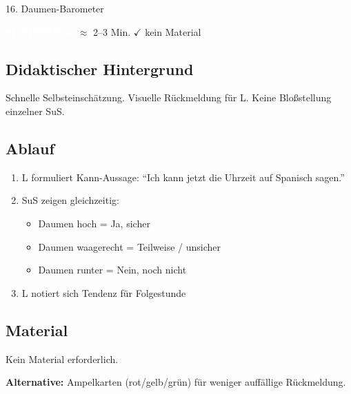 \documentclass[11pt, a4paper]{article}
\newcommand{\tagSicherung}{\colorbox{sicherung}{\textcolor{white}{\footnotesize\textbf{SICHERUNG}}}}
\newcommand{\zeit}[1]{\textcolor{grau}{\footnotesize $\approx$ #1 Min.}}
\newcommand{\matKeine}{\textcolor{erfolg}{$\checkmark$ kein Material}}
\begin{document}
\begin{methode}{16. Daumen-Barometer}

\tagSicherung{} \zeit{2--3} \hfill \matKeine

\subsection*{Didaktischer Hintergrund}
Schnelle Selbsteinschätzung. Visuelle Rückmeldung für L. Keine Bloßstellung einzelner SuS.

\subsection*{Ablauf}
\begin{enumerate}[leftmargin=*]
    \item L formuliert Kann-Aussage: ``Ich kann jetzt die Uhrzeit auf Spanisch sagen.''
    \item SuS zeigen gleichzeitig:
    \begin{itemize}
        \item Daumen hoch = Ja, sicher
        \item Daumen waagerecht = Teilweise / unsicher
        \item Daumen runter = Nein, noch nicht
    \end{itemize}
    \item L notiert sich Tendenz für Folgestunde
\end{enumerate}

\subsection*{Material}
\begin{materialbox}
Kein Material erforderlich.

\textbf{Alternative:} Ampelkarten (rot/gelb/grün) für weniger auffällige Rückmeldung.
\end{materialbox}

\end{methode}

\vspace{1em}
\end{document}
